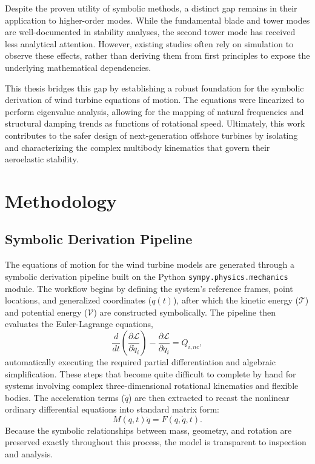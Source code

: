 \documentclass[final,onecolumn]{IEEEtran}
\begin{document}
Despite the proven utility of symbolic methods, a distinct gap remains in their application to higher-order modes. While the fundamental blade and tower modes are well-documented in stability analyses, the second tower mode has received less analytical attention. However, existing studies often rely on simulation to observe these effects, rather than deriving them from first principles to expose the underlying mathematical dependencies.

This thesis bridges this gap by establishing a robust foundation for the symbolic derivation of wind turbine equations of motion. The equations were linearized to perform eigenvalue analysis, allowing for the mapping of natural frequencies and structural damping trends as functions of rotational speed. Ultimately, this work contributes to the safer design of next-generation offshore turbines by isolating and characterizing the complex multibody kinematics that govern their aeroelastic stability.

\section{Methodology}\label{sec:methodology}

\subsection{Symbolic Derivation Pipeline}
The equations of motion for the wind turbine models are generated through a symbolic derivation pipeline built on the Python \texttt{sympy.physics.mechanics} module. The workflow begins by defining the system's reference frames, point locations, and generalized coordinates ($q(t)$), after which the kinetic energy ($\mathcal{T}$) and potential energy ($\mathcal{V}$) are constructed symbolically. The pipeline then evaluates the Euler-Lagrange equations,
\begin{equation}
    \frac{d}{dt}\left(\frac{\partial\mathcal{L}}{\partial\dot{q}_{i}}\right)-\frac{\partial\mathcal{L}}{\partial q_{i}}=Q_{i,nc},
\end{equation}
automatically executing the required partial differentiation and algebraic simplification. These steps that become quite difficult to complete by hand for systems involving complex three-dimensional rotational kinematics and flexible bodies. The acceleration terms ($\ddot{q}$) are then extracted to recast the nonlinear ordinary differential equations into standard matrix form:
\begin{equation}
    M(q,t)\ddot{q} = F(q,\dot{q},t).
\end{equation}
Because the symbolic relationships between mass, geometry, and rotation are preserved exactly throughout this process, the model is transparent to inspection and analysis.
\end{document}

